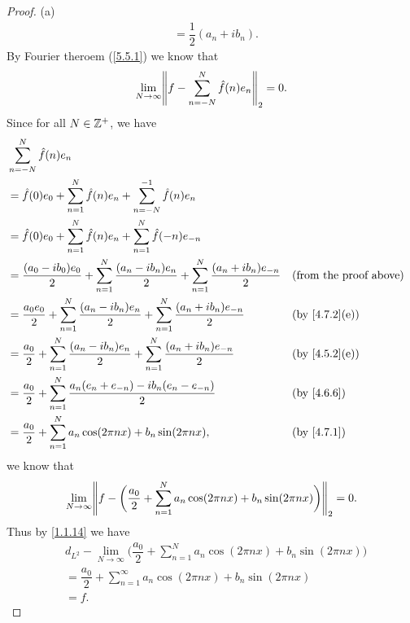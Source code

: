\begin{proof}{(a)}
\begin{align*}
     & = \dfrac{1}{2} (a_n + i b_n).
  \end{align*}
  By Fourier theroem (\cref{5.5.1}) we know that
  \[
    \lim_{N \to \infty} \norm*{f - \sum_{n = -N}^N \hat{f}(n) e_n}_2 = 0.
  \]
  Since for all \(N \in \mathbb{Z}^+\), we have
  \begin{align*}
     & \sum_{n = -N}^N \hat{f}(n) e_n                                                                                                                                   \\
     & = \hat{f}(0) e_0 + \sum_{n = 1}^N \hat{f}(n) e_n + \sum_{n = -N}^{-1} \hat{f}(n) e_n                                                                             \\
     & = \hat{f}(0) e_0 + \sum_{n = 1}^N \hat{f}(n) e_n + \sum_{n = 1}^N \hat{f}(-n) e_{-n}                                                                             \\
     & = \dfrac{(a_0 - i b_0) e_0}{2} + \sum_{n = 1}^N \dfrac{(a_n - i b_n) e_n}{2} + \sum_{n = 1}^N \dfrac{(a_n + i b_n) e_{-n}}{2} &  & \text{(from the proof above)} \\
     & = \dfrac{a_0 e_0}{2} + \sum_{n = 1}^N \dfrac{(a_n - i b_n) e_n}{2} + \sum_{n = 1}^N \dfrac{(a_n + i b_n) e_{-n}}{2}           &  & \text{(by \cref{4.7.2}(e))}   \\
     & = \dfrac{a_0}{2} + \sum_{n = 1}^N \dfrac{(a_n - i b_n) e_n}{2} + \sum_{n = 1}^N \dfrac{(a_n + i b_n) e_{-n}}{2}               &  & \text{(by \cref{4.5.2}(e))}   \\
     & = \dfrac{a_0}{2} + \sum_{n = 1}^N \dfrac{a_n (e_n + e_{-n}) - i b_n (e_n - e_{-n})}{2}                                        &  & \text{(by \cref{4.6.6})}      \\
     & = \dfrac{a_0}{2} + \sum_{n = 1}^N a_n \cos(2 \pi n x) + b_n \sin(2 \pi n x),                                                  &  & \text{(by \cref{4.7.1})}
  \end{align*}
  we know that
  \[
    \lim_{N \to \infty} \norm*{f - \bigg(\dfrac{a_0}{2} + \sum_{n = 1}^N a_n \cos(2 \pi n x) + b_n \sin(2 \pi n x)\bigg)}_2 = 0.
  \]
  Thus by \cref{1.1.14} we have
  \begin{align*}
     & d_{L^2} - \lim_{N \to \infty} \bigg(\dfrac{a_0}{2} + \sum_{n = 1}^N a_n \cos(2 \pi n x) + b_n \sin(2 \pi n x)\bigg) \\
     & = \dfrac{a_0}{2} + \sum_{n = 1}^\infty a_n \cos(2 \pi n x) + b_n \sin(2 \pi n x)                                    \\
     & = f.
  \end{align*}
\end{proof}

